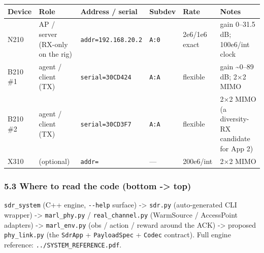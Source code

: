 \documentclass[
  10pt,
]{article}
\begin{document}
\begin{longtable}[]{@{}llllll@{}}
\toprule
Device & Role & Address / serial & Subdev & Rate & Notes \\
\midrule
\endhead
N210 & AP / server (RX-only on the rig) & \texttt{addr=192.168.20.2} &
\texttt{A:0} & 2e6/1e6 exact & gain 0--31.5 dB; 100e6/int clock \\
B210 \#1 & agent / client (TX) & \texttt{serial=30CD424} & \texttt{A:A}
& flexible & gain \textasciitilde0--89 dB; 2×2 MIMO \\
B210 \#2 & agent / client (TX) & \texttt{serial=30CD3F7} & \texttt{A:A}
& flexible & 2×2 MIMO (a diversity-RX candidate for App 2) \\
X310 & (optional) & \texttt{addr=} & --- & 200e6/int & 2×2 MIMO \\
\bottomrule
\end{longtable}

\hypertarget{53-where-to-read-the-code-bottom---top}{%
\subsubsection{5.3 Where to read the code (bottom -\textgreater{}
top)}\label{53-where-to-read-the-code-bottom---top}}

\texttt{sdr\_system} (C++ engine, \texttt{-\/-help} surface)
-\textgreater{} \texttt{sdr.py} (auto-generated CLI wrapper)
-\textgreater{} \texttt{marl\_phy.py} / \texttt{real\_channel.py}
(WarmSource / AccessPoint adapters) -\textgreater{}
\texttt{marl\_env.py} (obs / action / reward around the ACK)
-\textgreater{} proposed \texttt{phy\_link.py} (the \texttt{SdrApp} +
\texttt{PayloadSpec} + \texttt{Codec} contract). Full engine reference:
\texttt{../SYSTEM\_REFERENCE.pdf}.
\end{document}
